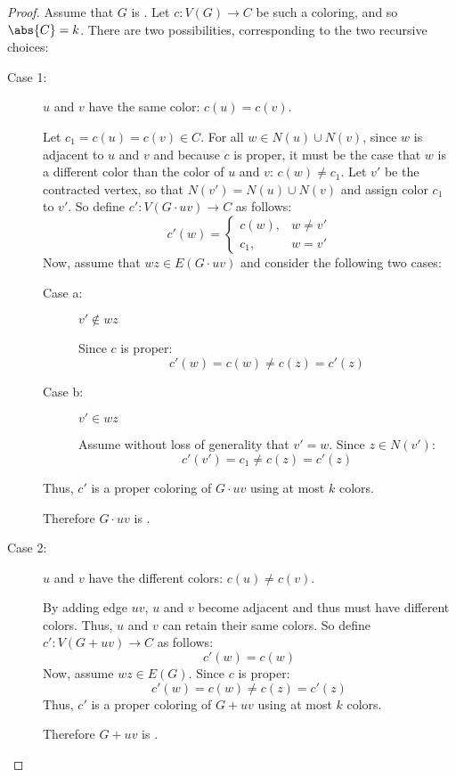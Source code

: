 \begin{proof}
  Assume that \(G\) is .  Let \(c:V(G)\to C\) be such a coloring, and so \(\abs{C}=k\).  There are two
  possibilities, corresponding to the two recursive choices:
  \begin{description}
  \item [Case 1:] \(u\) and \(v\) have the same color: \(c(u)=c(v)\).

    Let \(c_1=c(u)=c(v)\in C\).  For all \(w\in N(u)\cup N(v)\), since \(w\) is adjacent to \(u\) and \(v\) and
    because \(c\) is proper, it must be the case that \(w\) is a different color than the color of \(u\) and \(v\):
    \(c(w)\ne c_1\).  Let \(v'\) be the contracted vertex, so that \(N(v')=N(u)\cup N(v)\) and assign color \(c_1\)
    to \(v'\).  So define \(c':V(G\cdot uv)\to C\) as follows:
    \[c'(w)=\begin{cases}
    c(w), & w\ne v' \\
    c_1, & w=v'
    \end{cases}\]
    Now, assume that \(wz\in E(G\cdot uv)\) and consider the following two cases:
    \begin{description}
    \item[Case a:] \(v'\notin wz\)

      Since \(c\) is proper:
      \[c'(w)=c(w)\ne c(z)=c'(z)\]
    \item[Case b:] \(v'\in wz\)

      Assume without loss of generality that \(v'=w\).  Since \(z\in N(v')\):
      \[c'(v')=c_1\ne c(z)=c'(z)\]
    \end{description}

    Thus, \(c'\) is a proper coloring of \(G\cdot uv\) using at most \(k\) colors.
      
    Therefore \(G\cdot uv\) is .

  \item [Case 2:] \(u\) and \(v\) have the different colors: \(c(u)\ne c(v)\).

    By adding edge \(uv\), \(u\) and \(v\) become adjacent and thus must have different colors.  Thus, \(u\)
    and \(v\) can retain their same colors.  So define \(c':V(G+uv)\to C\) as follows:
    \[c'(w)=c(w)\]
    Now, assume \(wz\in E(G)\).  Since \(c\) is proper:
    \[c'(w)=c(w)\ne c(z)=c'(z)\]
    Thus, \(c'\) is a proper coloring of \(G+uv\) using at most \(k\) colors.

    Therefore \(G+uv\) is .
  \end{description}


\end{proof}
